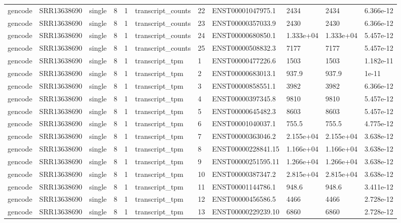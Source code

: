 \begin{tabular}{lllllllllll}
gencode & SRR13638690 & single & 8 & 1 & transcript\_counts & 22 & ENST00001047975.1 & 2434 & 2434 & 6.366e-12 \\
gencode & SRR13638690 & single & 8 & 1 & transcript\_counts & 23 & ENST00000357033.9 & 2430 & 2430 & 6.366e-12 \\
gencode & SRR13638690 & single & 8 & 1 & transcript\_counts & 24 & ENST00000680850.1 & 1.333e+04 & 1.333e+04 & 5.457e-12 \\
gencode & SRR13638690 & single & 8 & 1 & transcript\_counts & 25 & ENST00000508832.3 & 7177 & 7177 & 5.457e-12 \\
gencode & SRR13638690 & single & 8 & 1 & transcript\_tpm & 1 & ENST00000477226.6 & 1503 & 1503 & 1.182e-11 \\
gencode & SRR13638690 & single & 8 & 1 & transcript\_tpm & 2 & ENST00000683013.1 & 937.9 & 937.9 & 1e-11 \\
gencode & SRR13638690 & single & 8 & 1 & transcript\_tpm & 3 & ENST00000858551.1 & 3982 & 3982 & 6.366e-12 \\
gencode & SRR13638690 & single & 8 & 1 & transcript\_tpm & 4 & ENST00000397345.8 & 9810 & 9810 & 5.457e-12 \\
gencode & SRR13638690 & single & 8 & 1 & transcript\_tpm & 5 & ENST00000645482.3 & 8603 & 8603 & 5.457e-12 \\
gencode & SRR13638690 & single & 8 & 1 & transcript\_tpm & 6 & ENST00001040037.1 & 755.5 & 755.5 & 4.775e-12 \\
gencode & SRR13638690 & single & 8 & 1 & transcript\_tpm & 7 & ENST00000363046.2 & 2.155e+04 & 2.155e+04 & 3.638e-12 \\
gencode & SRR13638690 & single & 8 & 1 & transcript\_tpm & 8 & ENST00000228841.15 & 1.166e+04 & 1.166e+04 & 3.638e-12 \\
gencode & SRR13638690 & single & 8 & 1 & transcript\_tpm & 9 & ENST00000251595.11 & 1.266e+04 & 1.266e+04 & 3.638e-12 \\
gencode & SRR13638690 & single & 8 & 1 & transcript\_tpm & 10 & ENST00000387347.2 & 2.815e+04 & 2.815e+04 & 3.638e-12 \\
gencode & SRR13638690 & single & 8 & 1 & transcript\_tpm & 11 & ENST00001144786.1 & 948.6 & 948.6 & 3.411e-12 \\
gencode & SRR13638690 & single & 8 & 1 & transcript\_tpm & 12 & ENST00000456586.5 & 4466 & 4466 & 2.728e-12 \\
gencode & SRR13638690 & single & 8 & 1 & transcript\_tpm & 13 & ENST00000229239.10 & 6860 & 6860 & 2.728e-12 \\

\end{tabular}
